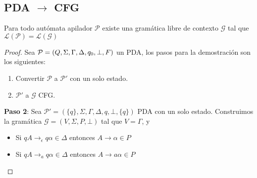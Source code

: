 \documentclass[a4paper,twoside,master.tex]{article}
\begin{document}
\subsection*{PDA $\to$ CFG}

\begin{teorema}
    Para todo autómata apilador $\mathcal{P}$ existe una gramática libre de contexto $\mathcal{G}$ tal que $\mathcal{L}(\mathcal{P}) = \mathcal{L}(\mathcal{G})$
\end{teorema}

\begin{proof}
    Sea $\mathcal{P} = (Q, \Sigma, \Gamma, \Delta, q_0, \bot, F)$ un PDA, los pasos para la demostración son los siguientes:
    \begin{enumerate}
        \item Convertir $\mathcal{P}$ a $\mathcal{P}'$ con un solo estado.
        \item $\mathcal{P}'$ a $\mathcal{G}$ CFG.
    \end{enumerate}

    \textbf{Paso 2}: Sea $\mathcal{P}' = (\{ q \}, \Sigma, \Gamma, \Delta, q, \bot, \{ q \})$ PDA con un solo estado. Construimos la gramática $\mathcal{G} = (V, \Sigma, P, \bot)$ tal que $V = \Gamma$, y
    \begin{itemize}
        \item Si $qA \to_{\epsilon} q\alpha \in \Delta$ entonces $A \to \alpha \in P$
        \item Si $qA \to_{a} q\alpha \in \Delta$ entonces $A \to a\alpha \in P$
    \end{itemize}
\end{proof}
\end{document}

